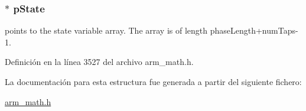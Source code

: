 \subsubsection[{\texorpdfstring{p\+State}{pState}}]{$\ast$ p\+State}\hypertarget{structarm__fir__interpolate__instance__f32_a335c87e6fdc4b96601d95a5de8b9c463}{}\label{structarm__fir__interpolate__instance__f32_a335c87e6fdc4b96601d95a5de8b9c463}
points to the state variable array. The array is of length phase\+Length+num\+Taps-\/1. 

Definición en la línea 3527 del archivo arm\+\_\+math.\+h.



La documentación para esta estructura fue generada a partir del siguiente fichero\+:\begin{DoxyCompactItemize}
\item 
\hyperlink{arm__math_8h}{arm\+\_\+math.\+h}\end{DoxyCompactItemize}
